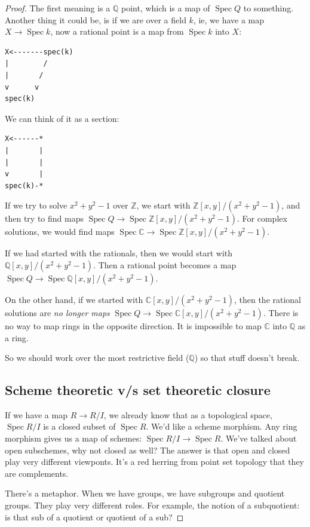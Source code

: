 \documentclass{book}
\newcommand{\Z}{\ensuremath{\mathbb{Z}}}
\newcommand{\Q}{\ensuremath{\mathbb{Q}}}
\newcommand{\C}{\ensuremath{\mathbb{C}}}
\newcommand{\spec}{\operatorname{Spec}}
\theoremstyle{definition}
\begin{document}
\begin{proof}
The first meaning is a $\Q$ point, which is a map of $\spec Q$ to something.
Another thing it could be, is if we are over a field $k$, ie, we have a map
$X \rightarrow \spec k$, now a rational point is a map from $\spec k$ into $X$:

\begin{verbatim}
X<-------spec(k)
|        /
|       /
v      v
spec(k)
\end{verbatim}

We can think of it as a section:
\begin{verbatim}
X<------*
|       |
|       |
v       |
spec(k)-*
\end{verbatim}

If we try to solve $x^2 + y^2 - 1$ over $\Z$, we start with 
$\Z[x, y]/(x^2 + y^2 - 1)$, and then try to find maps $\spec Q \rightarrow  \spec \Z[x, y] / (x^2 + y^2 - 1)$.
For complex solutions, we would find maps $\spec \C \rightarrow \spec \Z[x, y] / (x^2 + y^2 - 1)$.

If we had started with the rationals, then we would start with $\Q[x, y]/(x^2 + y^2 - 1)$.
Then a rational point becomes a map $\spec Q \rightarrow \spec \Q[x, y]/(x^2 + y^2 - 1)$.

On the other hand, if we started with $\C[x, y]/(x^2 + y^2 - 1)$, then the rational
solutions are \emph{no longer maps} $\spec Q \rightarrow \spec \C[x, y]/(x^2 + y^2 - 1)$.
There is no way to map rings in the opposite direction. It is impossible to map $\C$
into $\Q$ as a ring.

So we should work over the most restrictive field ($\Q$) so that stuff doesn't
break.

\subsection{Scheme theoretic v/s set theoretic closure}

If we have a map $R \rightarrow R/I$, we already know that as a topological space,
$\spec R/I$ is a closed subset of $\spec R$.  We'd like a scheme morphism.
Any ring morphism gives us a map of schemes: $\spec R/I \rightarrow \spec R$.
We've talked about open subschemes, why not closed as well? The answer is that
open and closed play very different viewponts. It's a red herring from point
set topology that they are complements.

There's a metaphor. When we have groups, we have subgroups and quotient groups.
They play very different roles. For example, the notion of a subquotient: is that
sub of a quotient or quotient of a sub? 


\end{proof}
\end{document}
